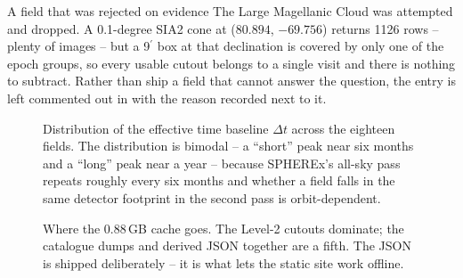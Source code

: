 \documentclass[11pt,a4paper]{article}
\newcommand{\arcmin}{\ensuremath{{}^{\prime}}}
\newcommand{\code}[1]{\texttt{\small\detokenize{#1}}}
\begin{document}
\begin{cautionbox}{A field that was rejected on evidence}
The Large Magellanic Cloud was attempted and dropped. A 0.1-degree SIA2 cone at
($80.894$, $-69.756$) returns 1126 rows -- plenty of images -- but a 9\arcmin{} box at that
declination is covered by only one of the epoch groups, so every usable cutout belongs to a single
visit and there is nothing to subtract. Rather than ship a field that cannot answer the question, the
entry is left commented out in \code{TARGETS} with the reason recorded next to it.
\end{cautionbox}

\begin{figure}[H]
\centering
{}
\caption{Distribution of the effective time baseline $\Delta t$ across the eighteen fields. The
distribution is bimodal -- a ``short'' peak near six months and a ``long'' peak near a year -- because
SPHEREx's all-sky pass repeats roughly every six months and whether a field falls in the same
detector footprint in the second pass is orbit-dependent.}
\label{fig:dt}
\end{figure}

\begin{figure}[H]
\centering
{}
\caption{Where the 0.88\,GB cache goes. The Level-2 cutouts dominate; the catalogue dumps and
derived JSON together are a fifth. The JSON is shipped deliberately -- it is what lets the static
site work offline.}
\label{fig:volume}
\end{figure}
\end{document}
